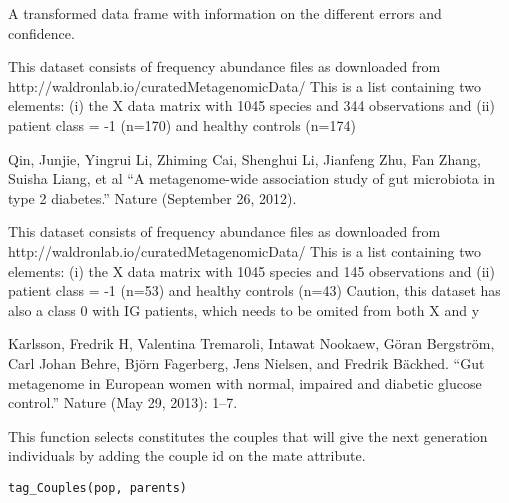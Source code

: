 \documentclass[a4paper]{book}
\begin{document}
%
\begin{Value}
A transformed data frame with information on the different errors and confidence.
\end{Value}
%
\begin{Description}
This dataset consists of frequency abundance files as downloaded from http://waldronlab.io/curatedMetagenomicData/
This is a list containing two elements: (i) the X data matrix with 1045 species and 344 observations and (ii) patient class = -1 (n=170) and healthy controls (n=174)
\end{Description}
%
\begin{Author}
Qin, Junjie, Yingrui Li, Zhiming Cai, Shenghui Li, Jianfeng Zhu, Fan Zhang, Suisha Liang, et al “A metagenome-wide association study of gut microbiota in type 2 diabetes.” Nature (September 26, 2012).
\end{Author}
%
\begin{Description}
This dataset consists of frequency abundance files as downloaded from http://waldronlab.io/curatedMetagenomicData/
This is a list containing two elements: (i) the X data matrix with 1045 species and 145 observations and (ii) patient class = -1 (n=53) and healthy controls (n=43)
Caution, this dataset has also a class 0 with IG patients, which needs to be omited from both X and y
\end{Description}
%
\begin{Author}
Karlsson, Fredrik H, Valentina Tremaroli, Intawat Nookaew, Göran Bergström, Carl Johan Behre, Björn Fagerberg, Jens Nielsen, and Fredrik Bäckhed. “Gut metagenome in European women with normal, impaired and diabetic glucose control.” Nature (May 29, 2013): 1–7.
\end{Author}
%
\begin{Description}
This function selects constitutes the couples that will give the
next generation individuals by adding the couple id on the mate attribute.
\end{Description}
%
\begin{Usage}
\begin{verbatim}
tag_Couples(pop, parents)
\end{verbatim}
\end{Usage}
\end{document}
